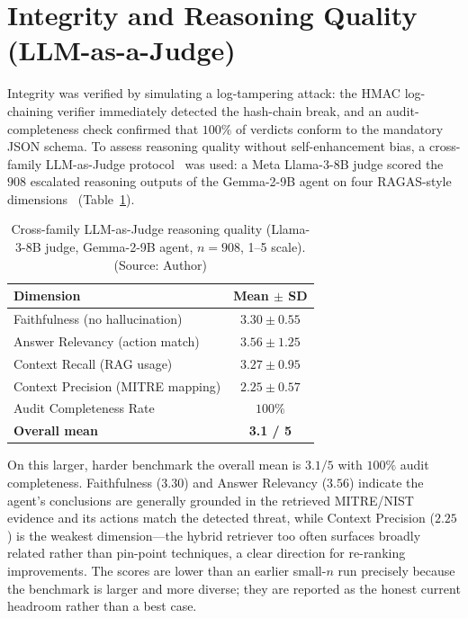 \section{Integrity and Reasoning Quality (LLM-as-a-Judge)}
Integrity was verified by simulating a log-tampering attack: the HMAC log-chaining verifier immediately detected the hash-chain break, and an audit-completeness check confirmed that $100\%$ of verdicts conform to the mandatory JSON schema. To assess reasoning quality without self-enhancement bias, a cross-family LLM-as-Judge protocol~\cite{zheng2023judge} was used: a Meta Llama-3-8B judge scored the $908$ escalated reasoning outputs of the Gemma-2-9B agent on four RAGAS-style dimensions~\cite{ragas2023} (Table~\ref{tab:ragas}).

\begin{table}[!htbp]
    \centering
    \caption{Cross-family LLM-as-Judge reasoning quality (Llama-3-8B judge, Gemma-2-9B agent, $n=908$, 1--5 scale). (Source: Author)}
    \label{tab:ragas}
    \begin{tabular}{|l|c|}
        \hline
        \textbf{Dimension} & \textbf{Mean $\pm$ SD} \\ \hline
        Faithfulness (no hallucination) & $3.30 \pm 0.55$ \\ \hline
        Answer Relevancy (action match) & $3.56 \pm 1.25$ \\ \hline
        Context Recall (RAG usage) & $3.27 \pm 0.95$ \\ \hline
        Context Precision (MITRE mapping) & $2.25 \pm 0.57$ \\ \hline
        Audit Completeness Rate & $100\%$ \\ \hline
        \textbf{Overall mean} & \textbf{3.1 / 5} \\ \hline
    \end{tabular}
\end{table}

On this larger, harder benchmark the overall mean is $3.1/5$ with $100\%$ audit completeness. Faithfulness ($3.30$) and Answer Relevancy ($3.56$) indicate the agent's conclusions are generally grounded in the retrieved MITRE/NIST evidence and its actions match the detected threat, while Context Precision ($2.25$) is the weakest dimension---the hybrid retriever too often surfaces broadly related rather than pin-point techniques, a clear direction for re-ranking improvements. The scores are lower than an earlier small-$n$ run precisely because the benchmark is larger and more diverse; they are reported as the honest current headroom rather than a best case.

